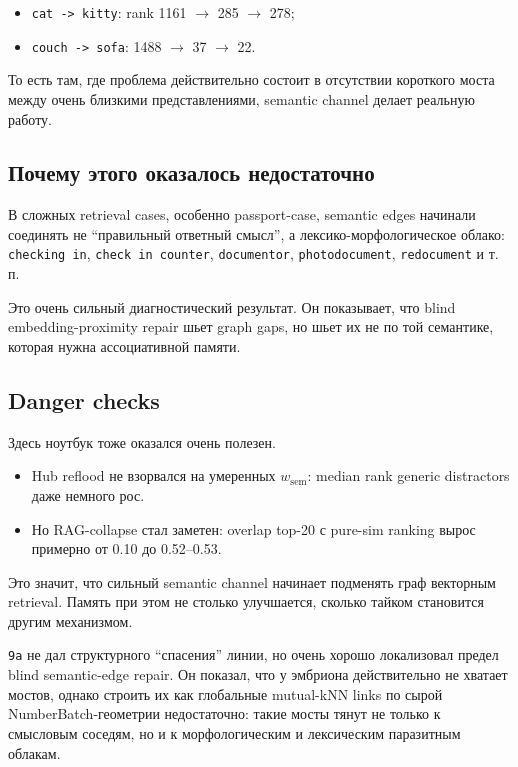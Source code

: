 \begin{itemize}[leftmargin=2em]
\item \texttt{cat -> kitty}: rank 1161 \(\to\) 285 \(\to\) 278;
\item \texttt{couch -> sofa}: 1488 \(\to\) 37 \(\to\) 22.
\end{itemize}

То есть там, где проблема действительно состоит в отсутствии короткого моста
между очень близкими представлениями, semantic channel делает реальную работу.

\subsection{Почему этого оказалось недостаточно}

В сложных retrieval cases, особенно passport-case, semantic edges начинали
соединять не ``правильный ответный смысл'', а лексико-морфологическое облако:
\texttt{checking in}, \texttt{check in counter}, \texttt{documentor},
\texttt{photodocument}, \texttt{redocument} и т.\,п.

Это очень сильный диагностический результат. Он показывает, что blind
embedding-proximity repair шьет graph gaps, но шьет их не по той семантике,
которая нужна ассоциативной памяти.

\subsection{Danger checks}

Здесь ноутбук тоже оказался очень полезен.

\begin{itemize}[leftmargin=2em]
\item Hub reflood не взорвался на умеренных \(w_{\mathrm{sem}}\): median rank
generic distractors даже немного рос.
\item Но RAG-collapse стал заметен: overlap top-20 с pure-sim ranking вырос
примерно от 0.10 до 0.52--0.53.
\end{itemize}

Это значит, что сильный semantic channel начинает подменять граф векторным
retrieval. Память при этом не столько улучшается, сколько тайком становится
другим механизмом.

\begin{takeaway}
\texttt{9a} не дал структурного ``спасения'' линии, но очень хорошо локализовал
предел blind semantic-edge repair. Он показал, что у эмбриона действительно не
хватает мостов, однако строить их как глобальные mutual-kNN links по сырой
NumberBatch-геометрии недостаточно: такие мосты тянут не только к смысловым
соседям, но и к морфологическим и лексическим паразитным облакам.
\end{takeaway}

